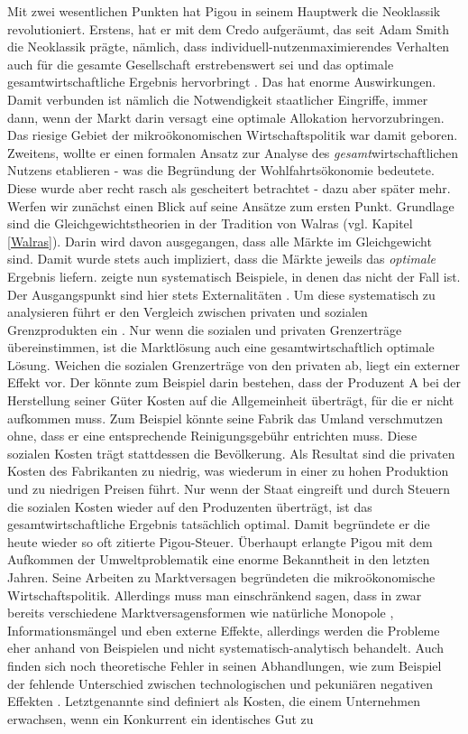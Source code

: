 Mit zwei wesentlichen Punkten hat Pigou in seinem Hauptwerk die Neoklassik revolutioniert. Erstens, hat er mit dem Credo aufgeräumt, das seit Adam Smith die Neoklassik prägte, nämlich, dass individuell-nutzenmaximierendes Verhalten auch für die gesamte Gesellschaft erstrebenswert sei und das optimale gesamtwirtschaftliche Ergebnis hervorbringt \parencite[S. 111]{Pigou1920}. Das hat enorme Auswirkungen. Damit verbunden ist nämlich die Notwendigkeit staatlicher Eingriffe, immer dann, wenn der Markt darin versagt eine optimale Allokation hervorzubringen. Das riesige Gebiet der mikroökonomischen Wirtschaftspolitik war damit geboren. Zweitens, wollte er einen formalen Ansatz zur Analyse des \textit{gesamt}wirtschaftlichen Nutzens etablieren - was die Begründung der Wohlfahrtsökonomie bedeutete. Diese wurde aber recht rasch als gescheitert betrachtet - dazu aber später mehr. Werfen wir zunächst einen Blick auf seine Ansätze zum ersten Punkt. Grundlage sind die Gleichgewichtstheorien in der Tradition von Walras (vgl. Kapitel \ref{Walras}). Darin wird davon ausgegangen, dass alle Märkte im Gleichgewicht sind. Damit wurde stets auch impliziert, dass die Märkte jeweils das \textit{optimale} Ergebnis liefern. \textcite{Pigou1920} zeigte nun systematisch Beispiele, in denen das nicht der Fall ist. Der Ausgangspunkt sind hier stets Externalitäten \parencite[S. 115]{Pigou1920}. Um diese systematisch zu analysieren führt er den Vergleich zwischen privaten und sozialen Grenzprodukten ein \parencite[S. 114]{Pigou1920}. Nur wenn die sozialen und privaten Grenzerträge übereinstimmen, ist die Marktlösung auch eine gesamtwirtschaftlich optimale Lösung. Weichen die sozialen Grenzerträge von den privaten ab, liegt ein externer Effekt vor. Der könnte zum Beispiel darin bestehen, dass der Produzent A bei der Herstellung seiner Güter Kosten auf die Allgemeinheit überträgt, für die er nicht aufkommen muss. Zum Beispiel könnte seine Fabrik das Umland verschmutzen ohne, dass er eine entsprechende Reinigungsgebühr entrichten muss. Diese sozialen Kosten trägt stattdessen die Bevölkerung. Als Resultat sind die privaten Kosten des Fabrikanten zu niedrig, was wiederum in einer zu hohen Produktion und zu niedrigen Preisen führt. Nur wenn der Staat eingreift und durch Steuern die sozialen Kosten wieder auf den Produzenten überträgt, ist das gesamtwirtschaftliche Ergebnis tatsächlich optimal. Damit begründete er die heute wieder so oft zitierte Pigou-Steuer. Überhaupt erlangte Pigou mit dem Aufkommen der Umweltproblematik eine enorme Bekanntheit in den letzten Jahren. Seine Arbeiten zu Marktversagen begründeten die mikroökonomische Wirtschaftspolitik. Allerdings muss man einschränkend sagen, dass in \textcite{Pigou1920} zwar bereits verschiedene Marktversagensformen wie natürliche Monopole \parencite[S. 240]{Pigou1920}, Informationsmängel \parencite[S. 131]{Pigou1920} und eben externe Effekte, allerdings werden die Probleme eher anhand von Beispielen und nicht systematisch-analytisch behandelt. Auch finden sich noch theoretische Fehler in seinen Abhandlungen, wie zum Beispiel der fehlende Unterschied zwischen technologischen und pekuniären negativen Effekten \parencite[S. 242]{Cansier1989}. Letztgenannte sind definiert als Kosten, die einem Unternehmen erwachsen, wenn ein Konkurrent ein identisches Gut zu 